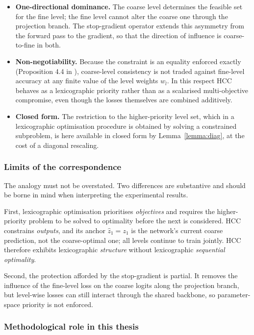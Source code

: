 \begin{itemize}
    \item \textbf{One-directional dominance.} The coarse level determines the feasible set for the fine level; the fine level cannot alter the coarse one through the projection branch. The stop-gradient operator extends this asymmetry from the forward pass to the gradient, so that the direction of influence is coarse-to-fine in both.
    \item \textbf{Non-negotiability.} Because the constraint is an equality enforced exactly (Proposition 4.4 in \cite{min2024hardnet}), coarse-level consistency is not traded against fine-level accuracy at any finite value of the level weights $w_l$. In this respect HCC behaves as a lexicographic priority rather than as a scalarised multi-objective compromise, even though the losses themselves are combined additively.
    \item \textbf{Closed form.} The restriction to the higher-priority level set, which in a lexicographic optimisation procedure is obtained by solving a constrained subproblem, is here available in closed form by Lemma~\ref{lemma:diag}, at the cost of a diagonal rescaling.
\end{itemize}

\subsubsection{Limits of the correspondence}

The analogy must not be overstated. Two differences are substantive and should be borne in mind when interpreting the experimental results.

First, lexicographic optimisation prioritises \emph{objectives} and requires the higher-priority problem to be solved to optimality before the next is considered. HCC constrains \emph{outputs}, and its anchor $\hat z_1=z_1$ is the network's current coarse prediction, not the coarse-optimal one; all levels continue to train jointly. HCC therefore exhibits lexicographic \emph{structure} without lexicographic \emph{sequential optimality}.

Second, the protection afforded by the stop-gradient is partial. It removes the influence of the fine-level loss on the coarse logits along the projection branch, but level-wise losses can still interact through the shared backbone, so parameter-space priority is not enforced.

\subsubsection{Methodological role in this thesis}

